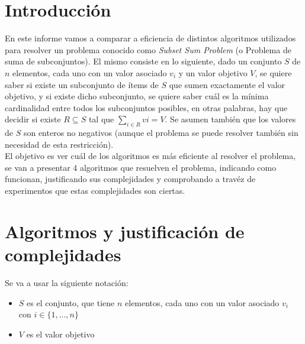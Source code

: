 \documentclass[a4paper]{article}
\begin{document}
\grupo{}
\newcommand{\senial}{\textit{se\~nal}}
\newcommand{\amplitud}{\textit{amplitud}}
\newcommand{\tiempo}{\textit{tiempo}}
\newcommand{\intervalo}{\textit{intervalo}}


\maketitle

\section*{Introducci\'on}

En este informe vamos a comparar a eficiencia de distintos algoritmos utilizados para resolver un problema conocido como \textit{Subset Sum Problem} (o Problema de suma de subconjuntos). El mismo consiste en lo siguiente, dado un conjunto $S$ de $n$ elementos, cada uno con un valor asociado $v_i$ y un valor objetivo $V$, se quiere saber si existe un subconjunto de \'items de $S$ que sumen exactamente el valor objetivo, y si existe dicho subconjunto, se quiere saber cu\'al es la m\'inima cardinalidad entre todos los subconjuntos posibles, en otras palabras, hay que decidir si existe $R \subseteq S$ tal que $\sum_{i \in R} vi = V$. Se asumen tambi\'en que los valores de $S$ son enteros no negativos (aunque el problema se puede resolver también sin necesidad de esta restricci\'on).
\\
El objetivo es ver cu\'al de los algoritmos es m\'as eficiente al resolver el problema, se van a presentar 4 algoritmos que resuelven el problema, indicando como funcionan, justificando sus complejidades y comprobando a trav\'ez de experimentos que estas complejidades son ciertas.

\section{Algoritmos y justificaci\'on de complejidades}

Se va a usar la siguiente notaci\'on:
\begin{itemize}
	\item $S$ es el conjunto, que tiene $n$ elementos, cada uno con un valor asociado $v_i$ con $i \in \{1,...,n\}$
	\item $V$ es el valor objetivo
\end{itemize}
\end{document}
